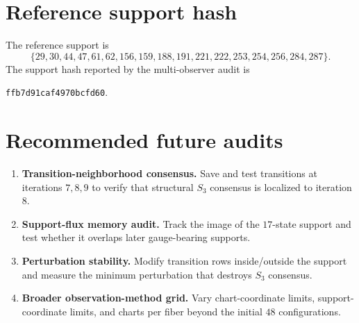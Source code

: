 \documentclass[11pt]{article}
\begin{document}
\section{Reference support hash}

The reference support is
\[
\{29,30,44,47,61,62,156,159,188,191,221,222,253,254,256,284,287\}.
\]
The support hash reported by the multi-observer audit is
\begin{center}
\texttt{ffb7d91caf4970bcfd60}.
\end{center}

\section{Recommended future audits}

\begin{enumerate}
\item \textbf{Transition-neighborhood consensus.}  Save and test transitions at iterations $7,8,9$ to verify that structural $S_3$ consensus is localized to iteration $8$.
\item \textbf{Support-flux memory audit.}  Track the image of the $17$-state support and test whether it overlaps later gauge-bearing supports.
\item \textbf{Perturbation stability.}  Modify transition rows inside/outside the support and measure the minimum perturbation that destroys $S_3$ consensus.
\item \textbf{Broader observation-method grid.}  Vary chart-coordinate limits, support-coordinate limits, and charts per fiber beyond the initial $48$ configurations.
\end{enumerate}
\end{document}

